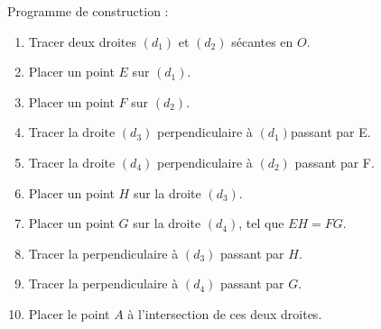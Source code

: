 \documentclass[12pt,a4paper]{article}
\begin{document}
	
	Programme de construction :
	\begin{enumerate}[label=\arabic*.]
		\item Tracer deux droites $(d_1)$ et $(d_2)$ sécantes en $O$.
		\item Placer un point $E$ sur $(d_1)$.
		\item Placer un point $F$ sur $(d_2)$.
		\item Tracer la droite $(d_3)$ perpendiculaire à $(d_1)$passant par E.
		\item Tracer la droite $(d_4)$ perpendiculaire à $(d_2)$ passant par F.
		\item Placer un point $H$ sur la droite $(d_3)$.
		\item Placer un point $G$ sur la droite $(d_4)$, tel que $EH=FG$.
		\item Tracer la perpendiculaire à $(d_3)$ passant par $H$.
		\item Tracer la perpendiculaire à $(d_4)$ passant par $G$.
		\item Placer le point $A$ à l'intersection de ces deux droites.
	\end{enumerate}
\end{document}
